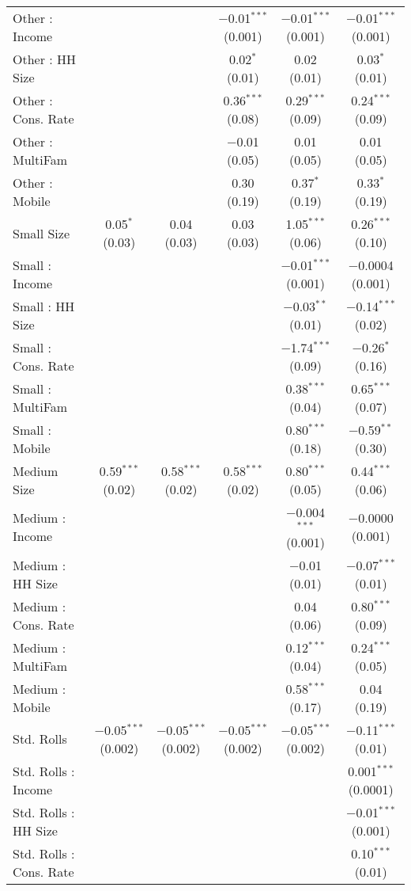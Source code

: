 \begin{table}[!htbp]
\begin{tabular}{@{\extracolsep{5pt}}lccccc}
  Other : Income &  &  & $-$0.01$^{***}$ (0.001) & $-$0.01$^{***}$ (0.001) & $-$0.01$^{***}$ (0.001) \\ 
  Other : HH Size &  &  & 0.02$^{*}$ (0.01) & 0.02 (0.01) & 0.03$^{*}$ (0.01) \\ 
  Other : Cons. Rate &  &  & 0.36$^{***}$ (0.08) & 0.29$^{***}$ (0.09) & 0.24$^{***}$ (0.09) \\ 
  Other : MultiFam &  &  & $-$0.01 (0.05) & 0.01 (0.05) & 0.01 (0.05) \\ 
  Other : Mobile &  &  & 0.30 (0.19) & 0.37$^{*}$ (0.19) & 0.33$^{*}$ (0.19) \\ 
  Small Size & 0.05$^{*}$ (0.03) & 0.04 (0.03) & 0.03 (0.03) & 1.05$^{***}$ (0.06) & 0.26$^{***}$ (0.10) \\ 
  Small : Income &  &  &  & $-$0.01$^{***}$ (0.001) & $-$0.0004 (0.001) \\ 
  Small : HH Size &  &  &  & $-$0.03$^{**}$ (0.01) & $-$0.14$^{***}$ (0.02) \\ 
  Small : Cons. Rate &  &  &  & $-$1.74$^{***}$ (0.09) & $-$0.26$^{*}$ (0.16) \\ 
  Small : MultiFam &  &  &  & 0.38$^{***}$ (0.04) & 0.65$^{***}$ (0.07) \\ 
  Small : Mobile &  &  &  & 0.80$^{***}$ (0.18) & $-$0.59$^{**}$ (0.30) \\ 
  Medium Size & 0.59$^{***}$ (0.02) & 0.58$^{***}$ (0.02) & 0.58$^{***}$ (0.02) & 0.80$^{***}$ (0.05) & 0.44$^{***}$ (0.06) \\ 
  Medium : Income &  &  &  & $-$0.004$^{***}$ (0.001) & $-$0.0000 (0.001) \\ 
  Medium : HH Size &  &  &  & $-$0.01 (0.01) & $-$0.07$^{***}$ (0.01) \\ 
  Medium : Cons. Rate &  &  &  & 0.04 (0.06) & 0.80$^{***}$ (0.09) \\ 
  Medium : MultiFam &  &  &  & 0.12$^{***}$ (0.04) & 0.24$^{***}$ (0.05) \\ 
  Medium : Mobile &  &  &  & 0.58$^{***}$ (0.17) & 0.04 (0.19) \\ 
  Std. Rolls & $-$0.05$^{***}$ (0.002) & $-$0.05$^{***}$ (0.002) & $-$0.05$^{***}$ (0.002) & $-$0.05$^{***}$ (0.002) & $-$0.11$^{***}$ (0.01) \\ 
  Std. Rolls : Income &  &  &  &  & 0.001$^{***}$ (0.0001) \\ 
  Std. Rolls : HH Size &  &  &  &  & $-$0.01$^{***}$ (0.001) \\ 
  Std. Rolls : Cons. Rate &  &  &  &  & 0.10$^{***}$ (0.01) \\ 

\end{tabular}
\end{table}
